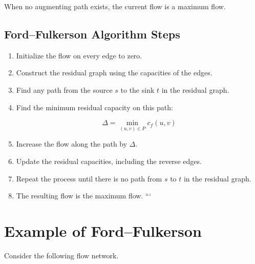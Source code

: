 \documentclass[12pt,a4paper]{article}
\begin{document}
When no augmenting path exists, the current flow is a maximum flow.

\subsection{Ford--Fulkerson Algorithm Steps}

\begin{enumerate}[label=\textbf{Step \arabic\*:}]

```
\item Initialize the flow on every edge to zero.

\item Construct the residual graph using the capacities of the
edges.

\item Find any path from the source $s$ to the sink $t$ in the
residual graph.

\item Find the minimum residual capacity on this path:

\[
\Delta =
\min_{(u,v)\in P} c_f(u,v)
\]

\item Increase the flow along the path by $\Delta$.

\item Update the residual capacities, including the reverse edges.

\item Repeat the process until there is no path from $s$ to $t$ in
the residual graph.

\item The resulting flow is the maximum flow.
```

\end{enumerate}

\section{Example of Ford--Fulkerson}

Consider the following flow network.

\begin{center}


\end{center}
\end{document}
